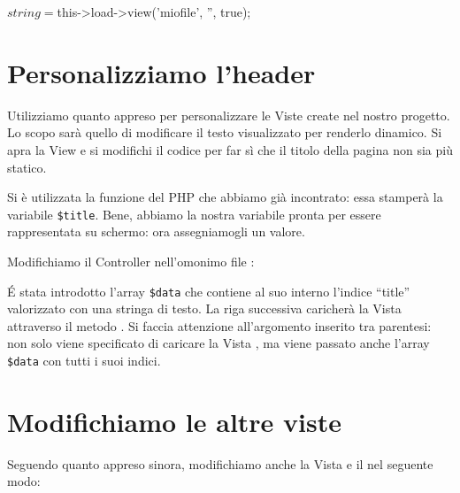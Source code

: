 \begin{code}
$string = $this->load->view('miofile', '', true);
\end{code}

\section{Personalizziamo l'header}
Utilizziamo quanto appreso per personalizzare le Viste create nel nostro progetto. Lo scopo sarà quello di modificare il testo visualizzato per renderlo dinamico. Si apra la View  e si modifichi il codice per far sì che il titolo della pagina non sia più statico.


Si è utilizzata la funzione  del \ac{PHP} che abbiamo già incontrato: essa stamperà la variabile \verb|$title|. Bene, abbiamo la nostra variabile pronta per essere rappresentata su schermo: ora assegniamogli un valore.

Modifichiamo il Controller  nell'omonimo file :


\'E stata introdotto l'array \verb|$data| che contiene al suo interno l'indice ``title'' valorizzato con una stringa di testo. La riga successiva caricherà la Vista attraverso il metodo . Si faccia attenzione all'argomento inserito tra parentesi: non solo viene specificato di caricare la Vista , ma viene passato anche l'array \verb|$data| con tutti i suoi indici.

\section*{Modifichiamo le altre viste}
Seguendo quanto appreso sinora, modifichiamo anche la Vista  e il  nel seguente modo:

